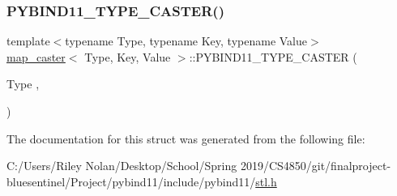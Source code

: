 \mbox{\label{structmap__caster_a2aec5030fb62b7cdd6a201b15b322a79}} 
\subsubsection{\texorpdfstring{PYBIND11\_TYPE\_CASTER()}{PYBIND11\_TYPE\_CASTER()}}
{\footnotesize\ttfamily template$<$typename Type, typename Key, typename Value$>$ \\
\mbox{\hyperlink{structmap__caster}{map\+\_\+caster}}$<$ Type, Key, Value $>$\+::P\+Y\+B\+I\+N\+D11\+\_\+\+T\+Y\+P\+E\+\_\+\+C\+A\+S\+T\+ER (\begin{DoxyParamCaption}\item[{Type}]{,  }\item[{\mbox{\hyperlink{descr_8h_af114703e20c6527e87163eb2798f74b8}{\+\_\+}}(\char`\"{}Dict\mbox{[}\char`\"{})+key\+\_\+conv\+::name+\mbox{\hyperlink{descr_8h_af114703e20c6527e87163eb2798f74b8}{\+\_\+}}(\char`\"{}, \char`\"{})+\mbox{\hyperlink{classtype__caster__base_a1287a0b427306b31949df84e062373ba}{value\+\_\+conv\+::name}}+\mbox{\hyperlink{descr_8h_af114703e20c6527e87163eb2798f74b8}{\+\_\+}}(\char`\"{}\mbox{]}\char`\"{})}]{ }\end{DoxyParamCaption})}



The documentation for this struct was generated from the following file\+:\begin{DoxyCompactItemize}
\item 
C\+:/\+Users/\+Riley Nolan/\+Desktop/\+School/\+Spring 2019/\+C\+S4850/git/finalproject-\/bluesentinel/\+Project/pybind11/include/pybind11/\mbox{\hyperlink{stl_8h}{stl.\+h}}\end{DoxyCompactItemize}
